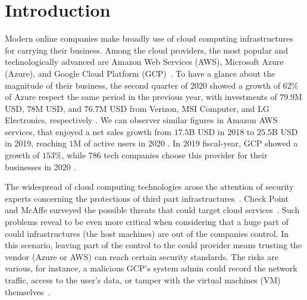 \chapter{Introduction} %
\label{chp:introduction} 


Modern online companies make broadly use of cloud computing infrastructures for 
carrying their business.
Among the cloud providers, the most popular and technologically advanced 
are Amazon Web Services (AWS), Microsoft Azure (Azure), and Google Cloud 
Platform (GCP)~\citep{flexera_report}.
To have a glance about the magnitude of their business, the second quarter of 
2020 showed a growth of $62$\% of Azure respect the same period in the 
previous year, with investments of $79.9$M USD, $78$M 
USD, and $76.7$M USD from Verizon, MSI Computer, and LG Electronics, 
respectively \citep{azure_business}.
We can observer similar figures in Amazon AWS services, that enjoyed a net 
sales growth from $17.5$B USD in 2018 to $25.5$B USD in 2019, reaching $1$M of 
active users in 2020 \citep{aws_business}.
In 2019 fiscal-year, GCP showed a growth of $153$\%, while $786$ tech companies 
choose this provider for their businesses in 2020 \citep{google_business}.

The widespread of cloud computing technologies arose the attention of security
experts concerning the protections of third part 
infrastructures~\citep{ryan2011cloud,sun2014data}.
Check Point and McAffe surveyed the possible threats that could target
cloud services~\citep{checkpoint_cloud,mcaffee_cloud}.
Such problems reveal to be even more critical when considering that a huge part 
of could infrastructures (\ie the host machines) are out of the companies 
control.
In this scenario, leaving part of the control to the could provider means 
trusting the vendor (\eg Azure or AWS) can reach certain security standards.
The risks are various, for instance, a malicious GCP's system admin could 
record the network traffic, access to the user's data, or tamper with the 
virtual machines (VM) themselves~\citep{insider_threat}.

